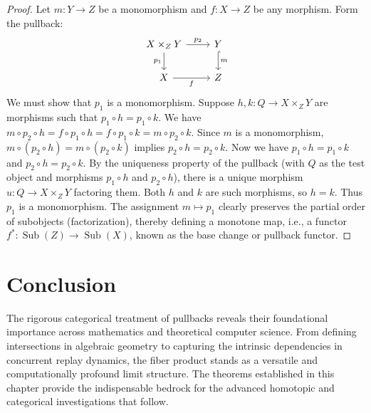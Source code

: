 \begin{proof}
Let $m: Y \to Z$ be a monomorphism and $f: X \to Z$ be any morphism. Form the pullback:
\begin{equation}
\label{eq:mono_pullback}
\begin{tikzcd}
X \times_Z Y \arrow[r, "p_2"] \arrow[d, "p_1"'] & Y \arrow[d, "m", hook] \\
X \arrow[r, "f"'] & Z
\end{tikzcd}
\end{equation}
We must show that $p_1$ is a monomorphism. 
Suppose $h, k: Q \to X \times_Z Y$ are morphisms such that $p_1 \circ h = p_1 \circ k$.
We have $m \circ p_2 \circ h = f \circ p_1 \circ h = f \circ p_1 \circ k = m \circ p_2 \circ k$.
Since $m$ is a monomorphism, $m \circ (p_2 \circ h) = m \circ (p_2 \circ k)$ implies $p_2 \circ h = p_2 \circ k$.
Now we have $p_1 \circ h = p_1 \circ k$ and $p_2 \circ h = p_2 \circ k$.
By the uniqueness property of the pullback (with $Q$ as the test object and morphisms $p_1 \circ h$ and $p_2 \circ h$), there is a unique morphism $u: Q \to X \times_Z Y$ factoring them. Both $h$ and $k$ are such morphisms, so $h = k$.
Thus $p_1$ is a monomorphism.
The assignment $m \mapsto p_1$ clearly preserves the partial order of subobjects (factorization), thereby defining a monotone map, i.e., a functor $f^*: \operatorname{Sub}(Z) \to \operatorname{Sub}(X)$, known as the base change or pullback functor.
\end{proof}

\section{Conclusion}

The rigorous categorical treatment of pullbacks reveals their foundational importance across mathematics and theoretical computer science. From defining intersections in algebraic geometry to capturing the intrinsic dependencies in concurrent replay dynamics, the fiber product stands as a versatile and computationally profound limit structure. The theorems established in this chapter provide the indispensable bedrock for the advanced homotopic and categorical investigations that follow.
